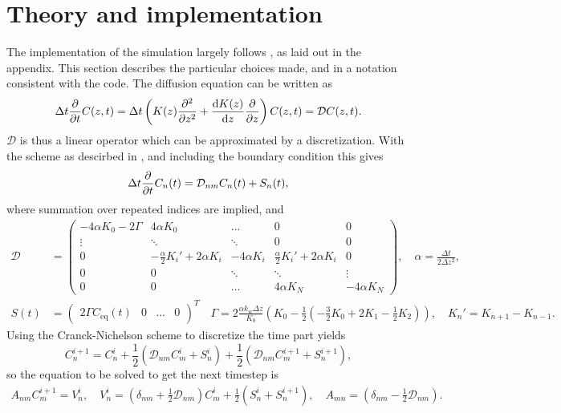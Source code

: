 \documentclass{article}
\begin{document}
    \section*{Theory and implementation}
    The implementation of the simulation largely follows \cite{exercise}, as laid out in the appendix.
    This section describes the particular choices made, and in a notation consistent with the code.
    The diffusion equation can be written as
    \begin{equation*}
        \Delta t \pdv{t} C(z, t) = \Delta t \left(K(z) \pdv[2]{z} + \dv{K(z)}{z}\pdv{z}\right) C(z, t) = \mathcal{D} C(z, t).
    \end{equation*}
    $\mathcal{D}$ is thus a linear operator which can be approximated by a discretization.
    With the scheme as descirbed in \cite{exercise}, and including the boundary condition this gives   
    \begin{equation*}
        \Delta t \pdv{t} C_n(t) = \mathcal{D}_{nm} C_n(t) + S_n(t),
    \end{equation*}
    where summation over repeated indices are implied, and
    \begin{align*}
        \mathcal{D} &=
        \begin{pmatrix}
            -4\alpha K_0 - 2\Gamma & 4\alpha K_0 & \dots & 0 & 0 \\
            \vdots & \ddots & \ddots & 0 & 0\\
            0 & -\frac{\alpha}{2} K_i' + 2\alpha K_i & -4 \alpha K_i & \frac{\alpha}{2}K_i' + 2\alpha K_i & 0 \\
            0 & 0 & \ddots & \ddots & \vdots\\
            0 & 0 & \dots & 4\alpha K_N & -4\alpha K_N
        \end{pmatrix}, \quad \alpha = \frac{\Delta t}{2 \Delta z^2 },\\
        S(t) & =  
        \begin{pmatrix}
            2\Gamma C_\mathrm{eq}(t) &0&\dots&0
        \end{pmatrix}^T \quad 
    \Gamma = 2 \frac{\alpha k_w \Delta z}{K_0} \left(K_0 - \frac{1}{2}(-\frac{3}{2} K_0 + 2K_1 - \frac{1}{2}K_2)\right), \quad
      K_n' = K_{n+1} - K_{n-1}.
    \end{align*}
    Using the Cranck-Nichelson scheme to discretize the time part yields
    \begin{equation*}
        C_n^{i+1}  = C_n^i + \frac{1}{2} (\mathcal{D}_{nm} C_m^i + S_n^i) + \frac{1}{2} (\mathcal{D}_{nm} C_m^{i+1} + S_n^{i+1}),
    \end{equation*}
    so the equation to be solved to get the next timestep is
    \begin{align*}
        A_{nm} C_{m}^{i+1} = V_n^i, \quad V_n^i = \left(\delta_{nm} + \frac{1}{2} \mathcal{D}_{nm}\right) C_m^i + \frac{1}{2}(S_n^i + S_n^{i+1}), \quad 
        A_{mn} = \left(\delta_{nm} - \frac{1}{2} \mathcal{D}_{nm}\right).
    \end{align*}
    
\end{document}

